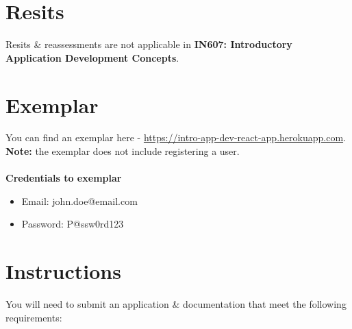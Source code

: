 \documentclass{article}
\begin{document}
\section*{Resits}
Resits \& reassessments are not applicable in \textbf{IN607: Introductory Application Development Concepts}. 

\newpage

\section*{Exemplar}
You can find an exemplar here - \small\href{https://intro-app-dev-react-app.herokuapp.com}{https://intro-app-dev-react-app.herokuapp.com}. \textbf{Note:} the exemplar does not include registering a user. \\ \\
\textbf{Credentials to exemplar}
\begin{itemize}
    \item Email: john.doe@email.com
    \item Password: P@ssw0rd123
\end{itemize}

\section*{Instructions}
You will need to submit an application \& documentation that meet the following requirements:
\end{document}
